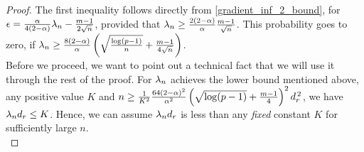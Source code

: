 \begin{proof}
The first inequality follows directly from \eqref{gradient_inf_2_bound}, for $\epsilon=\frac{\alpha}{4(2-\alpha)}\lambda_n-\frac{m-1}{2\sqrt{n}}$, provided that $\lambda_n\geq\frac{2(2-\alpha)}{\alpha}\frac{m-1}{\sqrt{n}}$. This probability goes to zero, if $\lambda_n\geq\frac{8(2-\alpha)}{\alpha}\left(\sqrt{\frac{\log(p-1)}{n}}+\frac{m-1}{4\sqrt{n}}\right)$.\\

\noindent Before we proceed, we want to point out a technical fact that we will use it through the rest of the proof. For $\lambda_n$ achieves the lower bound mentioned above, any positive value $K$ and $n\geq\frac{1}{K^2}\frac{64(2-\alpha)^2}{\alpha^2}\left(\sqrt{\log(p-1)}+\frac{m-1}{4}\right)^2d_{r}^{\,2}$, we have $\lambda_nd_{r}\leq K$. Hence, we can assume $\lambda_nd_{r}$ is less than any \emph{fixed} constant $K$ for sufficiently large $n$.\\


\end{proof}
